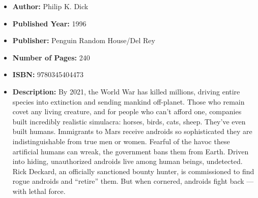\documentclass{tufte-handout}
\begin{document}
\begin{itemize}
    \item[] \textbf{Author:} Philip K. Dick
    \item[] \textbf{Published Year:} 1996
    \item[] \textbf{Publisher:} Penguin Random House/Del Rey
    \item[] \textbf{Number of Pages:} 240      
    \item[] \textbf{ISBN:} 9780345404473
    \item[] \textbf{Description:} By 2021, the World War has killed millions, driving entire species into extinction and sending mankind off-planet. Those who remain covet any living creature, and for people who can’t afford one, companies built incredibly realistic simulacra: horses, birds, cats, sheep. They’ve even built humans. Immigrants to Mars receive androids so sophisticated they are indistinguishable from true men or women. Fearful of the havoc these artificial humans can wreak, the government bans them from Earth. Driven into hiding, unauthorized androids live among human beings, undetected. Rick Deckard, an officially sanctioned bounty hunter, is commissioned to find rogue androids and ``retire'' them. But when cornered, androids fight back --- with lethal force.
\end{itemize}
\end{document}
